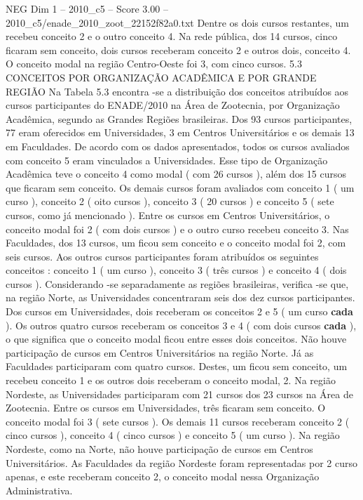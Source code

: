 \begin{textsample}{NEG Dim 1 – 2010\_c5 – Score 3.00 – 2010\_c5/enade\_2010\_zoot\_22152f82a0.txt}
Dentre os dois cursos restantes, um recebeu conceito 2 e o outro conceito 4.
Na rede pública, dos 14 cursos, cinco ficaram sem conceito, dois cursos receberam conceito 2 e outros dois, conceito 4.
O conceito modal na região Centro-Oeste foi 3, com cinco cursos. 5.3 CONCEITOS POR ORGANIZAÇÃO ACADÊMICA E POR GRANDE REGIÃO Na Tabela 5.3 encontra -se a distribuição dos conceitos atribuídos aos cursos participantes do ENADE/2010 na Área de Zootecnia, por Organização Acadêmica, segundo as Grandes Regiões brasileiras.
Dos 93 cursos participantes, 77 eram oferecidos em Universidades, 3 em Centros Universitários e os demais 13 em Faculdades.
De acordo com os dados apresentados, todos os cursos avaliados com conceito 5 eram vinculados a Universidades.
Esse tipo de Organização Acadêmica teve o conceito 4 como modal ( com 26 cursos ), além dos 15 cursos que ficaram sem conceito.
Os demais cursos foram avaliados com conceito 1 ( um curso ), conceito 2 ( oito cursos ), conceito 3 ( 20 cursos ) e conceito 5 ( sete cursos, como já mencionado ).
Entre os cursos em Centros Universitários, o conceito modal foi 2 ( com dois cursos ) e o outro curso recebeu conceito 3.
Nas Faculdades, dos 13 cursos, um ficou sem conceito e o conceito modal foi 2, com seis cursos.
Aos outros cursos participantes foram atribuídos os seguintes conceitos : conceito 1 ( um curso ), conceito 3 ( três cursos ) e conceito 4 ( dois cursos ).
Considerando -se separadamente as regiões brasileiras, verifica -se que, na região Norte, as Universidades concentraram seis dos dez cursos participantes.
Dos cursos em Universidades, dois receberam os conceitos 2 e 5 ( um curso \textbf{cada} ).
Os outros quatro cursos receberam os conceitos 3 e 4 ( com dois cursos \textbf{cada} ), o que significa que o conceito modal ficou entre esses dois conceitos.
Não houve participação de cursos em Centros Universitários na região Norte.
Já as Faculdades participaram com quatro cursos.
Destes, um ficou sem conceito, um recebeu conceito 1 e os outros dois receberam o conceito modal, 2.
Na região Nordeste, as Universidades participaram com 21 cursos dos 23 cursos na Área de Zootecnia.
Entre os cursos em Universidades, três ficaram sem conceito.
O conceito modal foi 3 ( sete cursos ).
Os demais 11 cursos receberam conceito 2 ( cinco cursos ), conceito 4 ( cinco cursos ) e conceito 5 ( um curso ).
Na região Nordeste, como na Norte, não houve participação de cursos em Centros Universitários.
As Faculdades da região Nordeste foram representadas por 2 curso apenas, e este receberam conceito 2, o conceito modal nessa Organização Administrativa.

\end{textsample}
